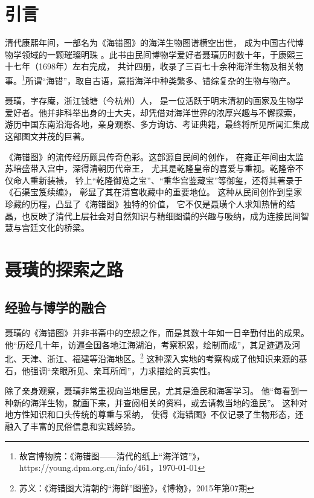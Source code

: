 \documentclass{source/Paper}
\begin{document}
\makeheader
\section{引言}
清代康熙年间，一部名为《海错图》的海洋生物图谱横空出世，
成为中国古代博物学领域的一颗璀璨明珠
。此书由民间博物学爱好者聂璜历时数十年，于康熙三十七年（1698年）左右完成，
共计四册，收录了三百七十余种海洋生物及相关物事。\footnote{故宫博物院：《\textlangle 海错图\textrangle ——清代的纸上“海洋馆”》， https://young.dpm.org.cn/info/461，\today}所谓“海错”，取自古语，意指海洋中种类繁多、错综复杂的生物与物产。

聂璜，字存庵，浙江钱塘（今杭州）人，
是一位活跃于明末清初的画家及生物学爱好者。他并非科举出身的士大夫，却凭借对海洋世界的浓厚兴趣与不懈探索，
游历中国东南沿海各地，亲身观察、多方询访、考证典籍，最终将所见所闻汇集成这部图文并茂的巨著。

《海错图》的流传经历颇具传奇色彩。这部源自民间的创作，
在雍正年间由太监苏培盛带入宫中，深得清朝历代帝王，
尤其是乾隆皇帝的喜爱与重视。乾隆帝不仅命人重新装裱，
钤上“乾隆御览之宝”、“重华宫鉴藏宝”等御玺，还将其著录于《石渠宝笈续编》，
彰显了其在清宫收藏中的重要地位。
这种从民间创作到皇家珍藏的历程，凸显了《海错图》独特的价值，
它不仅是聂璜个人求知热情的结晶，也反映了清代上层社会对自然知识与精细图谱的兴趣与吸纳，成为连接民间智慧与宫廷文化的桥梁。

\section{聂璜的探索之路}
\subsection{经验与博学的融合}
聂璜的《海错图》并非书斋中的空想之作，而是其数十年如一日辛勤付出的成果。
他“历经几十年，访遍全国各地江海湖泊，考察积累，绘制而成”，其足迹遍及河北、天津、浙江、福建等沿海地区。\footnote{苏义：《\textlangle 海错图\textrangle 大清朝的“海鲜”图鉴》，《博物》，2015年第07期}
这种深入实地的考察构成了他知识来源的基石，他强调“亲眼所见、亲耳所闻”，力求描绘的真实性。

除了亲身观察，聂璜非常重视向当地居民，尤其是渔民和海客学习。
他“每看到一种新的海洋生物，就画下来，并查阅相关的资料，或去请教当地的渔民”。
这种对地方性知识和口头传统的尊重与采纳，
使得《海错图》不仅记录了生物形态，还融入了丰富的民俗信息和实践经验。
\end{document}
